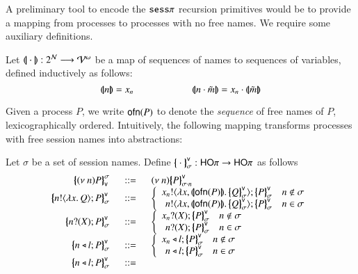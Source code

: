 A preliminary tool to encode the $\mathtt{sess}\pi$ recursion primitives would be to
provide a mapping from processes to processes with no free names.
We require some auxiliary definitions.
%
\begin{definition}\rm 
	Let $(\!|\!|\cdot|\!|\!): 2^{\mathcal{N}} \longrightarrow \mathcal{V}^\omega$
	be a map of sequences of names to sequences of variables, defined
	inductively as follows:
%
\[
	\vmap{n} = x_n \qquad \qquad \qquad \vmap{n \cat \tilde{m}} = x_n \cat \vmap{\tilde{m}}
\]
\end{definition}

Given a process $P$, we write $\mathsf{ofn}(P)$ to denote the
\emph{sequence} of free names of $P$, lexicographically ordered.
Intuitively, the following mapping transforms processes
with free session names into abstractions:
%
\begin{definition}\label{d:trabs}\rm
	Let $\sigma$ be a set of session names.
	Define $\big\{\!\!\big\{\cdot\big\}\!\!\big\}^\mathsf{v}_\sigma: \mathsf{HO}\pi \to \mathsf{HO}\pi$  as follows
%
\[
	\begin{array}{rcl}
		\auxmapp{\news{n} P}{\sigma}{\mathsf{v}} &\bnfis& \news{n} \auxmapp{P}{\mathsf{v}}{{\sigma \cat n}}\\
		\auxmapp{\bout{n}{\abs{x}{Q}} P}{\mathsf{v}}{\sigma} &\bnfis&
		\left\{
		\begin{array}{rl}
			\bout{x_n}{\abs{x,\vmap{\ofn{P}}}{\auxmapp{Q}{\mathsf{v}}{\sigma}}} \auxmapp{P}{\mathsf{v}}{\sigma} & n \notin \sigma\\
			\bout{n}{\abs{x,\vmap{\ofn{P}}}{\auxmapp{Q}{\mathsf{v}}{\sigma}}} \auxmapp{P}{\mathsf{v}}{\sigma} & n \in \sigma
		\end{array}
		\right.
		\\
		\auxmapp{\binp{n}{X} P}{\mathsf{v}}{\sigma} &\bnfis&
		\left\{
		\begin{array}{rl}
			\binp{x_n}{X} \auxmapp{P}{\mathsf{v}}{\sigma} & n \notin \sigma\\
			\binp{n}{X} \auxmapp{P}{\mathsf{v}}{\sigma} & n \in \sigma
		\end{array}
		\right.
		\\
		\auxmapp{\bsel{n}{l} P}{\mathsf{v}}{\sigma} &\bnfis&
		\left\{
		\begin{array}{rl}
			\bsel{x_n}{l} \auxmapp{P}{\mathsf{v}}{\sigma} & n \notin \sigma\\
			\bsel{n}{l} \auxmapp{P}{\mathsf{v}}{\sigma} & n \in \sigma
		\end{array}
		\right.
		\\
		\auxmapp{\bsel{n}{l} P}{\mathsf{v}}{\sigma} &\bnfis&

\end{array}\]
\end{definition}
